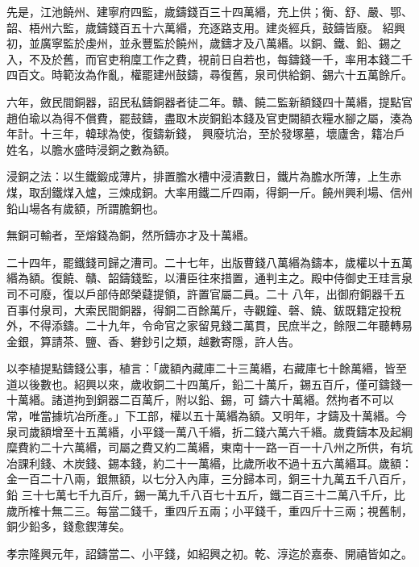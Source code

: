 \begin{pinyinscope}
 先是，江池饒州、建寧府四監，歲鑄錢百三十四萬緡，充上供；衡、舒、嚴、鄂、韶、梧州六監，歲鑄錢百五十六萬緡，充逐路支用。建炎經兵，鼓鑄皆廢。
 紹興初，並廣寧監於虔州，並永豐監於饒州，歲鑄才及八萬緡。以銅、鐵、鉛、錫之入，不及於舊，而官吏稍廩工作之費，視前日自若也，每鑄錢一千，率用本錢二千四百文。時範汝為作亂，權罷建州鼓鑄，尋復舊，泉司供給銅、錫六十五萬餘斤。



 六年，斂民間銅器，詔民私鑄銅器者徒二年。贛、饒二監新額錢四十萬緡，提點官趙伯瑜以為得不償費，罷鼓鑄，盡取木炭銅鉛本錢及官吏闕額衣糧水腳之屬，湊為年計。十三年，韓球為使，復鑄新錢，
 興廢坑治，至於發塚墓，壞廬舍，籍冶戶姓名，以膽水盛時浸銅之數為額。



 浸銅之法：以生鐵鍛成薄片，排置膽水槽中浸漬數日，鐵片為膽水所薄，上生赤煤，取刮鐵煤入爐，三煉成銅。大率用鐵二斤四兩，得銅一斤。饒州興利場、信州鉛山場各有歲額，所謂膽銅也。



 無銅可輸者，至熔錢為銅，然所鑄亦才及十萬緡。



 二十四年，罷鐵錢司歸之漕司。二十七年，出版曹錢八萬緡為鑄本，歲權以十五萬緡為額。復饒、贛、韶鑄錢監，以漕臣往來措置，通判主之。殿中侍御史王珪言泉司不可廢，復以戶部侍郎榮薿提領，許置官屬二員。二十
 八年，出御府銅器千五百事付泉司，大索民間銅器，得銅二百餘萬斤，寺觀鐘、磬、鐃、鈸既籍定投稅外，不得添鑄。二十九年，令命官之家留見錢二萬貫，民庶半之，餘限二年聽轉易金銀，算請茶、鹽、香、礬鈔引之類，越數寄隱，許人告。



 以李植提點鑄錢公事，植言：「歲額內藏庫二十三萬緡，右藏庫七十餘萬緡，皆至道以後數也。紹興以來，歲收銅二十四萬斤，鉛二十萬斤，錫五百斤，僅可鑄錢一十萬緡。諸道拘到銅器二百萬斤，附以鉛、錫，可
 鑄六十萬緡。然拘者不可以常，唯當據坑冶所產。」下工部，權以五十萬緡為額。又明年，才鑄及十萬緡。今泉司歲額增至十五萬緡，小平錢一萬八千緡，折二錢六萬六千緡。歲費鑄本及起綱糜費約二十六萬緡，司屬之費又約二萬緡，東南十一路一百一十八州之所供，有坑冶課利錢、木炭錢、錫本錢，約二十一萬緡，比歲所收不過十五六萬緡耳。歲額：金一百二十八兩，銀無額，以七分入內庫，三分歸本司，銅三十九萬五千八百斤，鉛
 三十七萬七千九百斤，錫一萬九千八百七十五斤，鐵二百三十二萬八千斤，比歲所榷十無二三。每當二錢千，重四斤五兩；小平錢千，重四斤十三兩；視舊制，銅少鉛多，錢愈鍥薄矣。



 孝宗隆興元年，詔鑄當二、小平錢，如紹興之初。乾、淳迄於嘉泰、開禧皆如之。




\end{pinyinscope}
